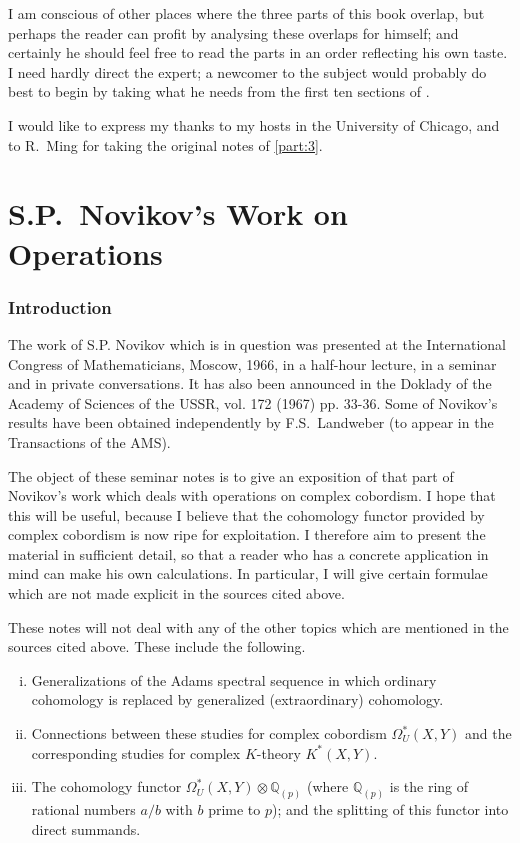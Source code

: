 \documentclass[english, oneside, letterpaper]{book}
\newcommand{\Q}{\mathbb{Q}}
\newcommand{\nn}[2]{#2} %
\begin{document}
I am conscious of other places where the three parts of this book overlap, but perhaps the reader can profit by analysing these overlaps for himself; and certainly he should feel free to read the parts in an order reflecting his own taste. I need hardly direct the expert; a newcomer to the subject would probably do best to begin by taking what he needs from the first ten sections of .

I would like to express my thanks to my hosts in the University of Chicago, and to R.\ Ming for taking the original notes of \cref{part:3}.
\mainmatter
\part{S.P.\ Novikov's Work on Operations}\label{part:1}
\setcounter{section}{0}
\section{Introduction}\label{sec:part-1-sec-1}
The work of S.P. Novikov which is in question was presented at the International Congress of Mathematicians, Moscow, 1966, in a half-hour lecture, in a seminar and in private conversations. It has also been announced in the Doklady of the Academy of Sciences of the USSR, vol. 172 (1967) pp. 33-36. Some of Novikov's results have been obtained independently by F.S.\ Landweber (to appear in the Transactions of the AMS).

The object of these seminar notes is to give an exposition of that part of Novikov's work which deals with operations on complex cobordism. I hope that this will be useful, because I believe that the cohomology functor provided by complex cobordism is now ripe for exploitation. I therefore aim to present the material in sufficient detail, so that a reader who has a concrete application in mind can make his own calculations. In particular, I will give certain formulae which are not made explicit in the sources cited above.

These notes will not deal with any of the other topics which are mentioned in the sources cited above. These include the following.
\begin{enumerate}[i.]
    \item Generalizations of the Adams spectral sequence in which ordinary cohomology is replaced by generalized (extraordinary) cohomology.
    \item Connections between these studies for complex cobordism $\Omega_U^*(X,Y)$ and the corresponding studies for complex $K$-theory $K^*(X,Y)$.
    \item The cohomology functor $\Omega_U^*(X,Y)\otimes\Q_{(p)}$ (where \nn{$\Q_p$}{$\Q_{(p)}}$ is the ring of rational numbers $a/b$ with $b$ prime to $p$); and the splitting of this functor into direct summands.
\end{enumerate}
\end{document}
